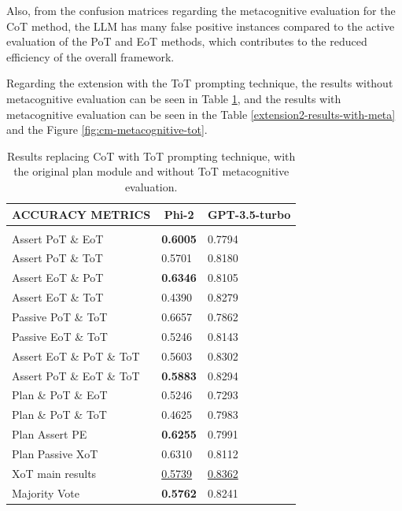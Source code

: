 \documentclass[10pt]{article} %
\begin{document}
Also, from the confusion matrices regarding the metacognitive evaluation for the CoT method, the LLM has many false positive instances compared to the active evaluation of the PoT and EoT methods, which contributes to the reduced efficiency of the overall framework.

Regarding the extension with the ToT prompting technique, the results without metacognitive evaluation can be seen in Table \ref{extension2-results-without-meta}, and the results with metacognitive evaluation can be seen in the Table \ref{extension2-results-with-meta} and the Figure \ref{fig:cm-metacognitive-tot}.

\begin{table}[t]
  \caption{Results replacing CoT with ToT prompting technique, with the original plan module and without ToT metacognitive evaluation.}
  \label{extension2-results-without-meta}
  \begin{center}
  \begin{tabular}{lll}
  \multicolumn{1}{c}{\bf ACCURACY METRICS}  &\multicolumn{1}{c}{\bf Phi-2}  &\multicolumn{1}{c}{\bf GPT-3.5-turbo}
  \\ \hline \\
  Assert PoT \& EoT                         &\textbf{0.6005}                &0.7794\\
  Assert PoT \& ToT                         &0.5701                         &0.8180\\
  Assert EoT \& PoT                         &\textbf{0.6346}                &0.8105\\
  Assert EoT \& ToT                         &0.4390                         &0.8279\\
  Passive PoT \& ToT                        &0.6657                         &0.7862\\
  Passive EoT \& ToT                        &0.5246                         &0.8143\\
  Assert EoT \& PoT \& ToT                  &0.5603                         &0.8302\\
  Assert PoT \& EoT \& ToT                  &\textbf{0.5883}                &0.8294\\
  Plan \& PoT \& EoT                        &0.5246                         &0.7293\\
  Plan \& PoT \& ToT                        &0.4625                         &0.7983\\
  Plan Assert PE                            &\textbf{0.6255}                &0.7991\\
  Plan Passive XoT                          &0.6310                         &0.8112\\
  XoT main results                          &\underline{0.5739}             &\underline{0.8362}\\
  Majority Vote                             &\textbf{0.5762}                &0.8241\\
  \end{tabular}
  \end{center}
  \end{table}
\end{document}
